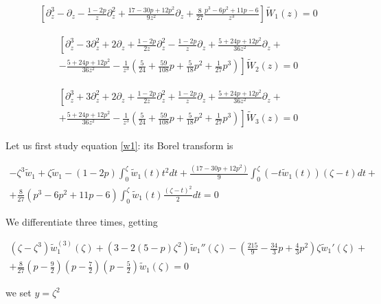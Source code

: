 \documentclass{article}
\theoremstyle{definition}
\begin{document}
\begin{multline}\label{w1}
\left[\partial_z^3-\partial_z-\frac{1-2p}{z}\partial_z^2+\frac{17-30p+12p^2}{9z^2}\partial_z+\frac{8}{27}\frac{p^3-6 p^2+ 11p- 6}{z^3}\right]\tilde{W}_1(z)=0
\end{multline}


\begin{multline}\label{w2}
\left[\partial_z^3-3\partial_z^2+2\partial_z+\frac{1-2p}{2z}\partial_z^2-\frac{1-2p}{z}\partial_z+\frac{5+24p+12p^2}{36z^2}\partial_z+\right.\\
\left.-\frac{5+24p+12p^2}{36z^2}-\frac{1}{z^3}\left(\frac{5}{24}+\frac{59}{108}p+\frac{5}{18}p^2+\frac{1}{27}p^3\right)\right]\tilde{W}_2(z)=0
\end{multline}

\begin{multline}\label{w3}
\left[\partial_z^3+3\partial_z^2+2\partial_z+\frac{1-2p}{2z}\partial_z^2+\frac{1-2p}{z}\partial_z+\frac{5+24p+12p^2}{36z^2}\partial_z+\right.\\
\left.+\frac{5+24p+12p^2}{36z^2}-\frac{1}{z^3}\left(\frac{5}{24}+\frac{59}{108}p+\frac{5}{18}p^2+\frac{1}{27}p^3\right)\right]\tilde{W}_3(z)=0
\end{multline}


Let us first study equation \eqref{w1}: its Borel transform is

\begin{multline*}
-\zeta^3\tilde{w}_1+\zeta\tilde{w}_1-(1-2p)\int_0^\zeta\tilde{w}_1(t)t^2dt+\frac{(17-30p+12p^2)}{9}\int_0^\zeta(-t\tilde{w}_1(t))(\zeta-t)dt+\\
+\frac{8}{27}(p^3-6p^2+11p-6)\int_0^\zeta\tilde{w}_1(t)\frac{(\zeta-t)^2}{2}dt=0
\end{multline*}

We differentiate three times, getting 

\begin{multline*}
\left(\zeta-\zeta^3\right)\tilde{w}_1^{(3)}(\zeta)+\left(3-2(5-p)\zeta^2\right)\tilde{w}_1''(\zeta)-\left(\frac{215}{9}-\frac{34}{3}p+\frac{4}{3}p^2\right)\zeta\tilde{w}_1'(\zeta)+\\
+\frac{8}{27}\left(p-\frac{9}{2}\right)\left(p-\frac{7}{2}\right)\left(p-\frac{5}{2}\right)\tilde{w}_1(\zeta)=0
\end{multline*}

we set $y=\zeta^2$
\end{document}
